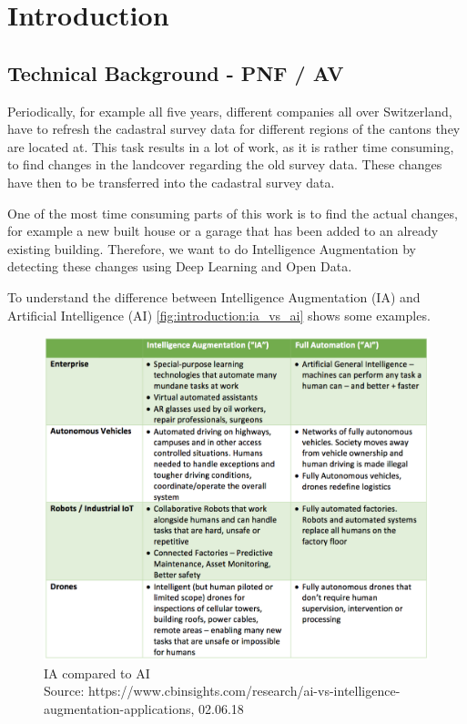 
\chapter{Introduction}
\section{Technical Background - PNF / AV}
Periodically, for example all five years, different companies all over Switzerland, have to refresh the cadastral survey data for different regions of the cantons they are located at. This task results in a lot of work, as it is rather time consuming, to find changes in the landcover regarding the old survey data. These changes have then to be transferred into the cadastral survey data.

One of the most time consuming parts of this work is to find the actual changes, for example a new built house or a garage that has been added to an already existing building. Therefore, we want to do Intelligence Augmentation \cite{Engelbart.1962} by detecting these changes using Deep Learning and Open Data.

To understand the difference between Intelligence Augmentation (IA) and Artificial Intelligence (AI) \autoref{fig:introduction:ia_vs_ai} shows some examples.


\begin{figure}[H]
    \centering
	\includegraphics[width=0.9\linewidth]{chapters/introduction/images/ia_vs_ai.png}
	\caption{IA compared to AI\\Source: https://www.cbinsights.com/research/ai-vs-intelligence-augmentation-applications, 02.06.18}
	\label{fig:introduction:ia_vs_ai}
\end{figure}


